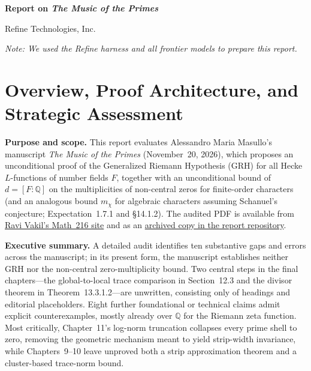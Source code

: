 \documentclass[11pt,letterpaper]{article}
\newcommand{\Q}{\mathbb{Q}}
\begin{document}
\fontsize{10.5}{12.65}\selectfont

{\LARGE\bfseries Report on \emph{The Music of the Primes}\par}
\vspace{4pt}
{\normalsize Refine Technologies, Inc.\par}
\vspace{2pt}
{\small\color{locgray}\itshape Note: We used the Refine harness and all frontier models to prepare this report.\par}
\vspace{4pt}

\section{Overview, Proof Architecture, and Strategic Assessment}

\textbf{Purpose and scope.} This report evaluates Alessandro Maria Masullo's manuscript \emph{The Music of the Primes} (November~20, 2026), which proposes an unconditional proof of the Generalized Riemann Hypothesis (GRH) for all Hecke $L$-functions of number fields $F$, together with an unconditional bound of $d=[F:\Q]$ on the multiplicities of non-central zeros for finite-order characters (and an analogous bound $m_\chi$ for algebraic characters assuming Schanuel's conjecture; Expectation~1.7.1 and \S14.1.2). The audited PDF is available from \href{https://math216.wordpress.com/wp-content/uploads/2026/11/the-music-of-the-primes.pdf}{Ravi Vakil's Math~216 site} and as an \href{https://raw.githubusercontent.com/Refine-Technologies-Inc/music-of-primes-report-by-refine/main/the-music-of-the-primes.pdf}{archived copy in the report repository}.

\textbf{Executive summary.} A detailed audit identifies ten substantive gaps and errors across the manuscript; in its present form, the manuscript establishes neither GRH nor the non-central zero-multiplicity bound. Two central steps in the final chapters---the global-to-local trace comparison in Section~12.3 and the divisor theorem in Theorem~13.3.1.2---are unwritten, consisting only of headings and editorial placeholders. Eight further foundational or technical claims admit explicit counterexamples, mostly already over $\Q$ for the Riemann zeta function. Most critically, Chapter~11's log-norm truncation collapses every prime shell to zero, removing the geometric mechanism meant to yield strip-width invariance, while Chapters~9--10 leave unproved both a strip approximation theorem and a cluster-based trace-norm bound.
\end{document}
